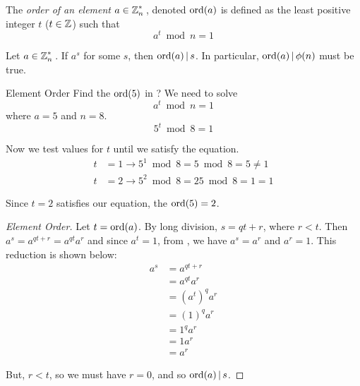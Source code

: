 \begin{definition}\label{def:Element_Order}
  The \emph{order of an element} $a \in \operatorname{\mathbb{Z}}_{n}^{*}{}$, denoted $\operatorname{\operatorname{ord}}(a)$ is defined as the least positive integer $t$ ($t \in \operatorname{\mathbb{Z}}$) such that
  \begin{equation}\label{eq:Element_Order}
    a^{t} \bmod n = 1
  \end{equation}
\end{definition}

\begin{lemma}\label{lemma:Element_Order}
  Let $a \in \operatorname{\mathbb{Z}}_{n}^{*}{}$.
  If $a^{s}$ for some $s$, then $\operatorname{\operatorname{ord}}(a) \operatorname{\vert} s$.
  In particular, $\operatorname{\operatorname{ord}}(a) \operatorname{\vert} \phi(n)$ must be true.
\end{lemma}

\begin{example}{Element Order}
  Find the $\operatorname{\operatorname{ord}}(5)$ in ?
  \tcblower{}
  We need to solve
  \begin{equation*}
    a^{t} \bmod n = 1
  \end{equation*}
  where $a = 5$ and $n = 8$.
  \begin{equation*}
    5^{t} \bmod 8 = 1
  \end{equation*}

  Now we test values for $t$ until we satisfy the equation.
  \begin{align*}
    t &= 1 \rightarrow 5^{1} \bmod 8 = 5 \bmod 8 = 5 \neq 1 \\
    t &= 2 \rightarrow 5^{2} \bmod 8 = 25 \bmod 8 = 1 = 1
  \end{align*}

  Since $t=2$ satisfies our equation, the $\operatorname{\operatorname{ord}}(5) = 2$.
\end{example}

\begin{proof}[Element Order]\label{proof:Element_Order}
  Let $t = \operatorname{\operatorname{ord}}(a)$.
  By long division, $s = qt + r$, where $r < t$.
  Then $a^{s} = a^{qt + r} = a^{qt}a^{r}$ and since $a^{t} = 1$, from , we have $a^{s} = a^{r}$ and $a^{r} = 1$.
  This reduction is shown below:
  \begin{align*}
    a^{s} &= a^{qt + r} \\
          &= a^{qt}a^{r} \\
          &= {\left( a^{t} \right)}^{q} a^{r} \\
          &= {\left( 1 \right)}^{q} a^{r} \\
          &= 1^{q} a^{r} \\
          &= 1 a^{r} \\
          &= a^{r}
  \end{align*}

  But, $r<t$, so we must have $r=0$, and so $\operatorname{\operatorname{ord}}(a) \operatorname{\vert} s$.
\end{proof}

